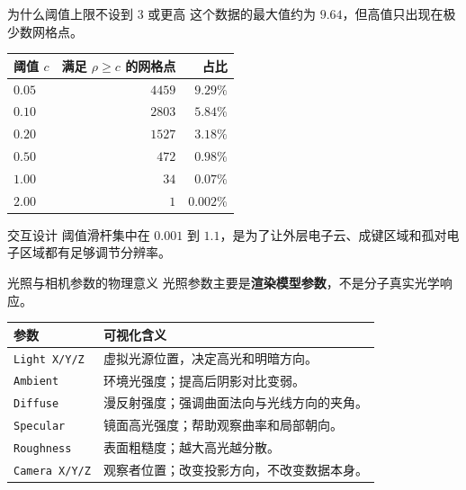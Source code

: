 \documentclass[aspectratio=169,11pt]{ctexbeamer}
\begin{document}
\begin{frame}{为什么阈值上限不设到 3 或更高}
  \small
  这个数据的最大值约为 $9.64$，但高值只出现在极少数网格点。

  \begin{table}
    \centering
    \begin{tabular}{lrr}
      \toprule
      阈值 $c$ & 满足 $\rho\ge c$ 的网格点 & 占比 \\
      \midrule
      $0.05$ & $4459$ & $9.29\%$ \\
      $0.10$ & $2803$ & $5.84\%$ \\
      $0.20$ & $1527$ & $3.18\%$ \\
      $0.50$ & $472$ & $0.98\%$ \\
      $1.00$ & $34$ & $0.07\%$ \\
      $2.00$ & $1$ & $0.002\%$ \\
      \bottomrule
    \end{tabular}
  \end{table}

  \begin{block}{交互设计}
    阈值滑杆集中在 $0.001$ 到 $1.1$，是为了让外层电子云、成键区域和孤对电子区域都有足够调节分辨率。
  \end{block}
\end{frame}

\begin{frame}{光照与相机参数的物理意义}
  光照参数主要是\textbf{渲染模型参数}，不是分子真实光学响应。

  \begin{table}
    \centering
    \begin{tabularx}{0.94\linewidth}{lX}
      \toprule
      参数 & 可视化含义 \\
      \midrule
      \texttt{Light X/Y/Z} & 虚拟光源位置，决定高光和明暗方向。 \\
      \texttt{Ambient} & 环境光强度；提高后阴影对比变弱。 \\
      \texttt{Diffuse} & 漫反射强度；强调曲面法向与光线方向的夹角。 \\
      \texttt{Specular} & 镜面高光强度；帮助观察曲率和局部朝向。 \\
      \texttt{Roughness} & 表面粗糙度；越大高光越分散。 \\
      \texttt{Camera X/Y/Z} & 观察者位置；改变投影方向，不改变数据本身。 \\
      \bottomrule
    \end{tabularx}
  \end{table}
\end{frame}
\end{document}
